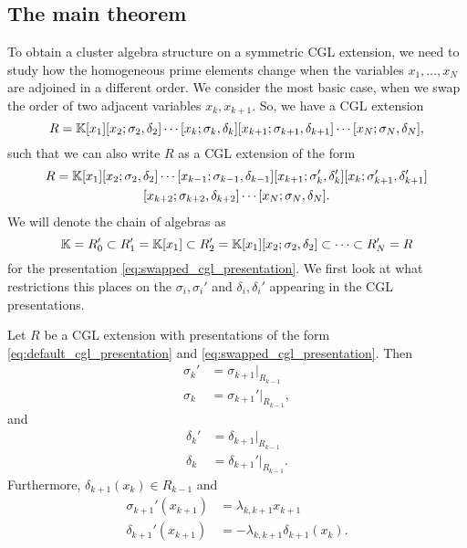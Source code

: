 \subsection{The main theorem}

To obtain a cluster algebra structure on a symmetric CGL extension, we need to study
how the homogeneous prime elements change when the variables $x_1, \dots, x_N$ are
adjoined in a different order. We consider the most basic case, when we swap the order
of two adjacent variables $x_k, x_{k+1}$. So, we have a CGL extension
\begin{equation}\label{eq:default_cgl_presentation}
	R = \mathbb{K}[x_1][x_2; \sigma_2, \delta_2]\cdots[x_k; \sigma_k, \delta_k][x_{k+1};\sigma_{k+1}, \delta_{k+1}]\cdots[x_N; \sigma_N, \delta_N],
\end{equation}
%
such that we can also write $R$ as a CGL extension of the form
\begin{multline}\label{eq:swapped_cgl_presentation}
	R = \mathbb{K}[x_1][x_2; \sigma_2, \delta_2]\cdots[x_{k-1}; \sigma_{k-1}, \delta_{k-1}][x_{k+1}; \sigma_k', \delta_k'][x_k;\sigma_{k+1}', \delta_{k+1}']\\
	[x_{k+2}; \sigma_{k+2}, \delta_{k+2}]\cdots[x_N; \sigma_N, \delta_N].
\end{multline}
%
We will denote the chain of algebras as
\begin{equation*}
	\mathbb{K} = R'_0 \subset R'_1  = \mathbb{K}[x_1] \subset R'_2 = \mathbb{K}[x_1][x_2; \sigma_2, \delta_2] \subset \cdots \subset R'_N = R
\end{equation*}
for the presentation \eqref{eq:swapped_cgl_presentation}.
We first look at what restrictions this places on the $\sigma_i, \sigma_i '$ and
$\delta_i,\delta_i'$ appearing in the CGL presentations.
\begin{lemma}\label{lem:swapped_cgl_sigma_delta}
	Let $R$ be a CGL extension with presentations of the form \eqref{eq:default_cgl_presentation} and \eqref{eq:swapped_cgl_presentation}. Then
	\begin{equation}\label{eq:sigma_prime}
		\begin{aligned}
			\sigma_k ' & = \sigma_{k+1}|_{R_{k-1}}    \\
			\sigma_k   & = \sigma_{k+1}' |_{R_{k-1}},
		\end{aligned}
	\end{equation}
	and
	\begin{equation}\label{eq:delta_prime}
		\begin{aligned}
			\delta_k ' & = \delta_{k+1}|_{R_{k-1}}    \\
			\delta_k   & = \delta_{k+1}' |_{R_{k-1}}.
		\end{aligned}
	\end{equation}
	Furthermore, $\delta_{k+1}(x_k) \in R_{k-1}$ and
	\begin{equation}\label{eq:sigma_delta_prime_x_k_1}
		\begin{aligned}
			\sigma_{k+1}'(x_{k+1}) & = \lambda_{k, k+1} x_{k+1}             \\
			\delta_{k+1}'(x_{k+1}) & = -\lambda_{k, k+1} \delta_{k+1}(x_k).
		\end{aligned}
	\end{equation}
\end{lemma}
